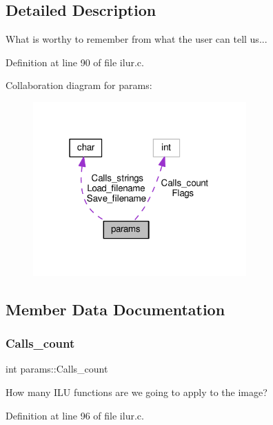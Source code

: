 \subsection{Detailed Description}
What is worthy to remember from what the user can tell us... 

Definition at line 90 of file ilur.\+c.



Collaboration diagram for params\+:
\nopagebreak
\begin{figure}[H]
\begin{center}
\leavevmode
\includegraphics[width=232pt]{d3/dcd/structparams__coll__graph}
\end{center}
\end{figure}


\subsection{Member Data Documentation}
\mbox{\label{structparams_a8ad607a3908fc21071ce0de2fbb77e91}} 
\subsubsection{\texorpdfstring{Calls\+\_\+count}{Calls\_count}}
{\footnotesize\ttfamily int params\+::\+Calls\+\_\+count}



How many I\+LU functions are we going to apply to the image? 



Definition at line 96 of file ilur.\+c.

\mbox{\label{structparams_a49f54a1a7ff00f127e7c855478771422}} 
